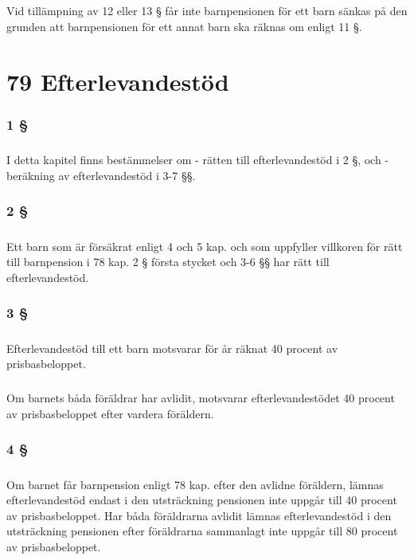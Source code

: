 \documentclass[a4paper,notitlepage,openany,10pt]{book}
\begin{document}
\paragraph*{}
Vid tillämpning av 12 eller 13 § får inte barnpensionen för ett barn sänkas på den grunden att barnpensionen för ett annat barn ska räknas om enligt 11 §.
\chapter*{79 Efterlevandestöd}
\subsection*{1 §}
\paragraph*{}
I detta kapitel finns bestämmelser om
\newline - rätten till efterlevandestöd i 2 §, och
\newline - beräkning av efterlevandestöd i 3-7 §§.
\subsection*{2 §}
\paragraph*{}
Ett barn som är försäkrat enligt 4 och 5 kap. och som uppfyller villkoren för rätt till barnpension i 78 kap. 2 § första stycket och 3-6 §§ har rätt till efterlevandestöd.
\subsection*{3 §}
\paragraph*{}
Efterlevandestöd till ett barn motsvarar för år räknat 40 procent av prisbasbeloppet.
\paragraph*{}
Om barnets båda föräldrar har avlidit, motsvarar efterlevandestödet 40 procent av prisbasbeloppet efter vardera föräldern.
\subsection*{4 §}
\paragraph*{}
Om barnet får barnpension enligt 78 kap. efter den avlidne föräldern, lämnas efterlevandestöd endast i den utsträckning pensionen inte uppgår till 40 procent av prisbasbeloppet. Har båda föräldrarna avlidit lämnas efterlevandestöd i den utsträckning pensionen efter föräldrarna sammanlagt inte uppgår till 80 procent av prisbasbeloppet.
\end{document}
